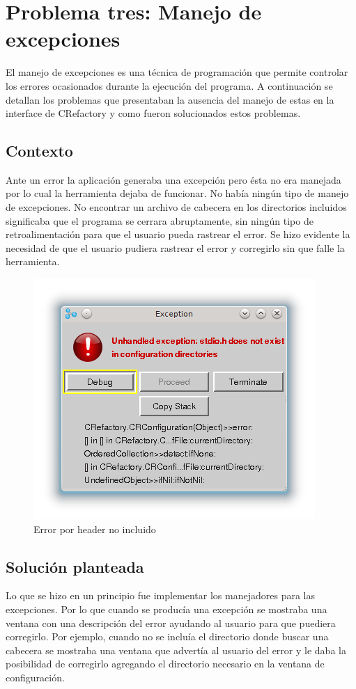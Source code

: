 \documentclass[a4paper,oneside,12pt]{article}
\begin{document}
\section{Problema tres: Manejo de excepciones}

El manejo de excepciones es una t\'ecnica de programaci\'on que permite controlar los errores ocasionados durante la ejecuci\'on del programa.
A continuaci\'on se detallan los problemas que presentaban la ausencia del manejo de estas en la interface de CRefactory y como fueron solucionados estos problemas.

\subsection{Contexto}
Ante un error la aplicaci\'on generaba una excepci\'on pero \'esta no era manejada por lo cual la herramienta dejaba de funcionar. No hab\'ia ning\'un tipo de manejo de excepciones. No encontrar un archivo de cabecera en los directorios incluidos significaba que el programa se cerrara abruptamente, sin ning\'un tipo de retroalimentaci\'on para que el usuario pueda rastrear el error. Se hizo evidente la necesidad de que el usuario pudiera rastrear el error y corregirlo sin que falle la herramienta.

\begin{figure}[h!]
  \centering
    \includegraphics[scale=0.85]{images/codigo_original/error_header_no_agregado.png}
     \caption{Error por header no incluido}
     \label{header_no_incluido}
\end{figure}

\subsection{Soluci\'on planteada}
Lo que se hizo en un principio fue implementar los manejadores para las excepciones. Por lo que cuando se produc\'ia una excepci\'on se mostraba una ventana con una descripci\'on del error ayudando al usuario para que puediera corregirlo. Por ejemplo, cuando no se inclu\'ia el directorio donde buscar una cabecera se mostraba una ventana que advert\'ia al usuario del error y le daba la posibilidad de corregirlo agregando el directorio necesario en la ventana de configuraci\'on.
\end{document}
